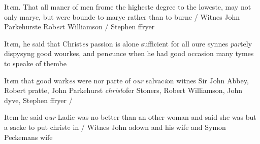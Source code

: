 \documentclass[12pt, a4paper]{book}
\begin{document}
				\marginpar[\vspace{0.5cm}{\textcolor{Gray}{aesno anno}}]{}
			
            	
				\marginpar[\vspace{0.5cm}{\textcolor{Gray}{vi articles}}]{}
			
            	
		\ifthenelse{\isodd{\thepage}}
		{\reversemarginpar}
		{\normalmarginpar}
		It\textit{e}m. That all maner of men frome the higheste degree to the
  loweste, may not only marye, but were bounde to marye
  rather than to burne / Witnes John Parkehurste
            		Rob\textit{er}t Williamson /  Stephen ffryer
            	

	
			
	
		\ifthenelse{\isodd{\thepage}}
		{\reversemarginpar}
		{\normalmarginpar}
		 It\textit{e}m, he said that Christ\textit{es} passion is alone sufficient for all
 oure synnes \textit{par}tely dispysyng good wourkes, and pen\textit{a}unce
 	when he had good occasion many tymes to speake of thembe
	
		\ifthenelse{\isodd{\thepage}}
		{\reversemarginpar}
		{\normalmarginpar}
		It\textit{e}m that good wark\textit{es} were nor parte of o\textit{ur} salvac\textit{i}on
		witnes Sir John Abbey, Robert pratte, John Parkehurst
		\textit{christ}ofer Stoners, Robert Williamson, John dyve, Stephen
		ffryer /

 
 	
			
            
			
            
		\ifthenelse{\isodd{\thepage}}
		{\reversemarginpar}
		{\normalmarginpar}
		Item he said o\textit{ur} Ladie was no better than an other woman
  and said she was but a sacke to put christe in /
  Witnes John adown and his wife and Symon
  	Peckemans wife

	
			
	
				\marginpar[\vspace{0.5cm}{\textcolor{Gray}{Images}}]{}
			
\end{document}
